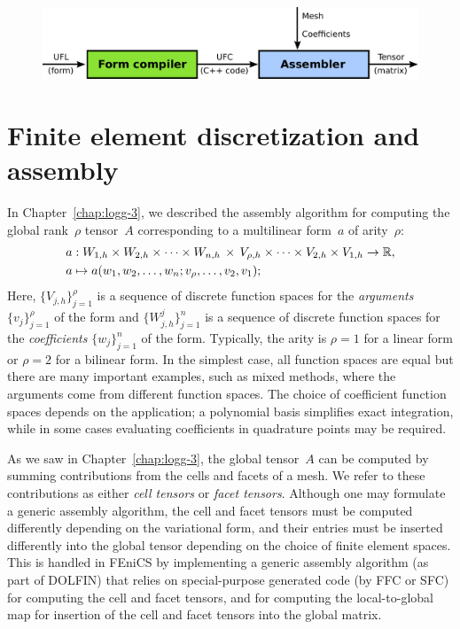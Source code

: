 \begin{figure}
          {\includegraphics[width=\fullfig]{chapters/alnes-2/pdf/ufc_flowdiagram.pdf}}
\end{figure}

\section{Finite element discretization and assembly}
\label{sec:alnes-2fem}

In Chapter~\ref{chap:logg-3}, we described the assembly algorithm for
computing the global rank~$\rho$ tensor~$A$ corresponding to a
multilinear form~$a$ of arity~$\rho$:
\begin{equation} \label{eq:varform}
  \begin{split}
    a &: W_{1,h} \times W_{2,h} \times \cdots \times W_{n,h} \, \times \,
    V_{\rho,h} \times \cdots \times V_{2,h} \times V_{1,h} \rightarrow \mathbb{R}, \\
    a &\mapsto a(w_1, w_2, \ldots, w_n; v_{\rho}, \ldots, v_2, v_1);
  \end{split}
\end{equation}
Here, $\{V_{j,h}\}_{j=1}^{\rho}$ is a sequence of discrete function
spaces for the \emph{arguments} $\{v_j\}_{j=1}^{\rho}$ of the form and
$\{W_{j,h}^j\}_{j=1}^n$ is a sequence of discrete function spaces for
the \emph{coefficients} $\{w_j\}_{j=1}^n$ of the form. Typically, the
arity is $\rho=1$ for a linear form or $\rho=2$ for a bilinear
form. In the simplest case, all function spaces are equal but there
are many important examples, such as mixed methods, where the
arguments come from different function spaces. The choice of
coefficient function spaces depends on the application; a polynomial
basis simplifies exact integration, while in some cases evaluating
coefficients in quadrature points may be required.

As we saw in Chapter~\ref{chap:logg-3}, the global tensor~$A$ can be
computed by summing contributions from the cells and facets of a
mesh. We refer to these contributions as either \emph{cell tensors} or
\emph{facet tensors}. Although one may formulate a generic assembly
algorithm, the cell and facet tensors must be computed differently
depending on the variational form, and their entries must be inserted
differently into the global tensor depending on the choice of finite
element spaces. This is handled in FEniCS by implementing a generic
assembly algorithm (as part of DOLFIN) that relies on special-purpose
generated code (by FFC or SFC) for computing the cell and facet
tensors, and for computing the local-to-global map for insertion of
the cell and facet tensors into the global matrix.

